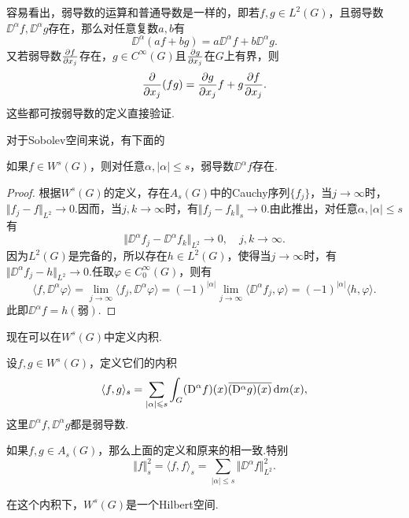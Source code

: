 容易看出，弱导数的运算和普通导数是一样的，即若$f,g\in L^2(G)$，且弱导数$\DD^\alpha f,\DD^\alpha g$存在，那么对任意复数$a,b$有
\[\DD^\alpha(af+bg)=a\DD^\alpha f+b\DD^\alpha g.\]
又若弱导数$\frac{\partial f}{\partial x_j}$存在，$g\in C^\infty(G)$且$\frac{\partial g}{\partial x_j}$在$G$上有界，则
\[\frac{\partial }{\partial x_j}(fg)=\frac{\partial g}{\partial x_j}f+g\frac{\partial f}{\partial x_j}.\]
这些都可按弱导数的定义直接验证.

对于Sobolev空间来说，有下面的
\begin{prop}\label{prop6.1.4}
	如果$f\in W^s(G)$，则对任意$\alpha,|\alpha|\le s$，弱导数$\DD^\alpha f$存在.
\end{prop}
\begin{proof}
	根据$W^s(G)$的定义，存在$A_s(G)$中的Cauchy序列$\{f_j\}$，当$j\to\infty$时，$\Vert f_j-f\Vert_{L^2}\to0$.因而，当$j,k\to\infty$时，有$\Vert f_j-f_k\Vert_s\to0$.由此推出，对任意$\alpha,|\alpha|\le s$有
	\[\Vert\DD^\alpha f_j-\DD^\alpha f_k\Vert_{L^2}\to0,\quad j,k\to\infty.\]
	因为$L^2(G)$是完备的，所以存在$h\in L^2(G)$，使得当$j\to\infty$时，有$\Vert\DD^\alpha f_j-h\Vert_{L^2}\to0$.任取$\varphi\in C_0^\infty(G)$，则有
	\[\langle f,\DD^\alpha\varphi\rangle=\lim_{j\to\infty}\langle f_j,\DD^\alpha \varphi\rangle=(-1)^{|\alpha|}\lim_{j\to\infty}\langle \DD^\alpha f_j,\varphi\rangle=(-1)^{|\alpha|}\langle h,\varphi\rangle.\]
	此即$\DD^\alpha f=h(\text{弱})$.
\end{proof}
现在可以在$W^s(G)$中定义内积.

设$f,g\in W^s(G)$，定义它们的内积
\[\langle f,g\rangle_s=\sum_{|\alpha|\leqslant s}\int_G(\mathrm D^\alpha f)(x){}\mkern1mu\overline{\mkern-1mu(\mathrm D^\alpha g)(x)}\mathop{}\!\mathrm{d} m(x),\]
这里$\DD^\alpha f,\DD^\alpha g$都是弱导数.

如果$f,g\in A_s(G)$，那么上面的定义和原来的相一致.特别
\[\Vert f\Vert_s^2=\langle f,f\rangle_s=\sum_{|\alpha|\le s}\Vert\DD^\alpha f\Vert_{L^2}^2.\]

在这个内积下，$W^s(G)$是一个Hilbert空间.

